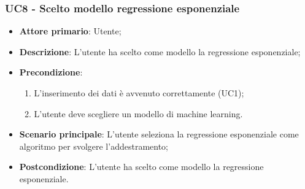 \subsubsection{UC8 - Scelto modello regressione esponenziale}
\label{sssec:uc8}
\begin{itemize}
  \item \textbf{Attore primario}: Utente;
  \item \textbf{Descrizione}: L'utente ha scelto come modello la regressione esponenziale;
  \item \textbf{Precondizione}:
  \begin{enumerate}
    \item L'inserimento dei dati è avvenuto correttamente (UC1);
    \item L'utente deve scegliere un modello di machine learning.
  \end{enumerate}
  \item \textbf{Scenario principale}: L'utente seleziona la regressione esponenziale come algoritmo per svolgere l'addestramento;
  \item \textbf{Postcondizione}: L'utente ha scelto come modello la regressione esponenziale.
\end{itemize}
